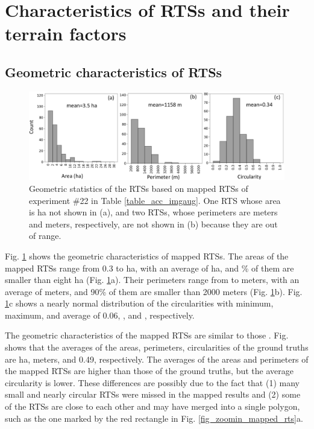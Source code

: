 \documentclass[authoryear,preprint,review,12pt]{elsarticle}
\begin{document}
\section{Characteristics of RTSs and their terrain factors}
\label{sec_spatial_terrain}


\subsection{Geometric characteristics of RTSs}
\label{subsec_geo_charac}

\begin{figure}
	\centering
	\includegraphics[width=14cm]{figures/geometric_var_mapped_trim.jpg}
	\caption{Geometric statistics of the RTSs based on mapped RTSs of experiment \#22 in Table \ref{table_acc_imgaug}. One RTS whose area is  ha not shown in (a), and two RTSs, whose perimeters are  meters and  meters, respectively, are not shown in (b) because they are out of range. }
	\label{fig_geometric_statistics}
\end{figure}


Fig. \ref{fig_geometric_statistics} shows the geometric characteristics of mapped RTSs.  The areas of the mapped RTSs range from 0.3 to  ha, with an average of  ha, and \% of them are smaller than eight ha (Fig. \ref{fig_geometric_statistics}a). Their perimeters range from  to  meters, with an average of  meters, and 90\% of them are smaller than 2000 meters  (Fig. \ref{fig_geometric_statistics}b). Fig. \ref{fig_geometric_statistics}c shows a nearly normal distribution of the circularities with minimum, maximum, and average of 0.06, , and , respectively. 

The geometric characteristics of the mapped RTSs are similar to those . Fig.  shows that the averages of the areas, perimeters, circularities of the ground truths 
 are  ha,  meters, and 0.49, respectively. The averages of the areas and perimeters of the mapped RTSs are higher than those of the ground truths, but the average circularity is lower. These differences are possibly due to the fact that (1) many small and nearly circular RTSs were missed in the mapped results and (2) some of the RTSs are close to each other and may have  merged into a single polygon, such as the one marked by the red rectangle in Fig. \ref{fig_zoomin_mapped_rts}a.  
\end{document}
